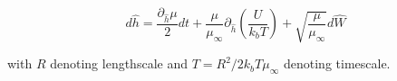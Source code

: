 $$ d\hat{h}  = \frac{\partial_{\hat{h}}\mu}{2}dt + \frac{\mu}{\mu_\infty}\partial_{\hat{h}}\left(\frac{U}{k_b T}\right) + \sqrt{\frac{\mu}{\mu_\infty}}d\hat{W} $$

with $R$ denoting lengthscale and $T  =R^2 / 2 k_b T \mu_\infty$ denoting timescale.
